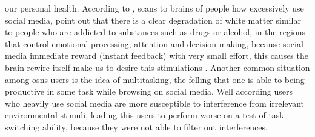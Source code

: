 our personal health. According to \citep{lin2012abnormal}, scans to brains of people how excessively use social media, point out that there is a clear degradation of white matter similar to people who are addicted to substances such as drugs or alcohol, in the regions that control emotional processing, attention and decision making, because social media immediate reward (instant feedback) with very small effort, this causes the brain rewire itself make us to desire this stimulations \citep{berridge1998role}. Another common situation among \glspl{osn} users is the idea of multitasking, the felling that one is able to being productive in some task while browsing on social media. Well according \citep{ophir2009cognitive} users who heavily use social media are more susceptible to interference from irrelevant environmental stimuli, leading this users to perform worse on a test of task-switching ability, because they were not able to filter out interferences.

